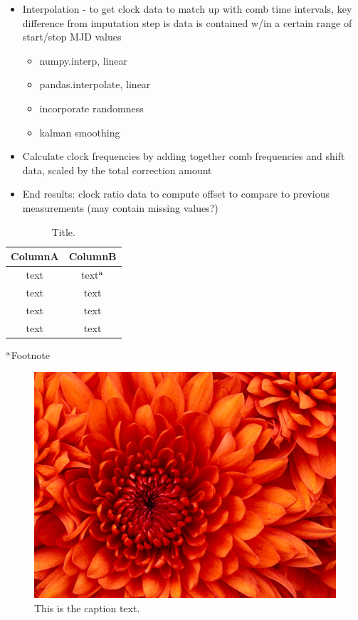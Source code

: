 \documentclass[
  12pt,
]{article}
\begin{document}
\begin{itemize}
\begin{itemize}
\end{itemize}
\item Interpolation - to get clock data to match up with comb time intervals, key difference from imputation step is data is contained w/in a certain range of start/stop MJD values 
\begin{itemize}
    \item numpy.interp, linear 
    \item pandas.interpolate, linear 
    \item incorporate randomness 
    \item kalman smoothing 
\end{itemize}
\item Calculate clock frequencies by adding together comb frequencies and shift data, scaled by the total correction amount 
\item End results: clock ratio data to compute offset to compare to previous measurements (may contain missing values?) 
\end{itemize}

\begin{table}[H]
    \centering
    \caption{Title.}
    \small
    \begin{tabular}{cc}
        \hline
        ColumnA & ColumnB \\ \hline
        text & text{\scriptsize $^{\textrm a}$} \\
        text & text \\
        text & text \\
        text & text \\
        \hline
    \end{tabular}
    
    {\footnotesize  {\scriptsize $^{\textrm a}$}Footnote}
\end{table}

\begin{figure}[h] 
    \centering  \includegraphics[width=0.5\linewidth]{Chrysanthemum.jpg}
    \caption{This is the caption text.}
    \label{fig:Chrysanthemum}
\end{figure}
\end{document}
